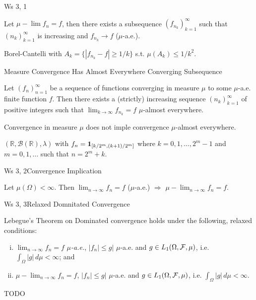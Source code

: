\begin{exercise}{Ws 3, 1}{}

    Let $\mu-\lim f_n = f$, then there exists a subsequence $(f_{n_k})_{k=1}^{\infty}$ such that $(n_k)_{k=1}^{\infty}$ is increasing and $f_{n_k} \to f$ ($\mu$-a.e.).

    \Hint Borel-Cantelli with $A_k = \{ |f_{n_k} - f| \geq 1/k \}$ s.t. $\mu(A_k) \leq 1/k^2$.

\end{exercise}

\begin{theorem}{5.4}{Measure Convergence Has Almost Everywhere Converging Subsequence}

    Let $(f_n)_{n=1}^{\infty}$ be a sequence of functions converging in measure $\mu$ to some $\mu$-a.e. finite function $f$. Then there exists a (strictly) increasing sequence $(n_k)_{k=1}^{\infty}$ of positive integers such that $\lim_{k \to \infty} f_{n_k} = f$ $\mu$-almost everywhere.

\end{theorem}

\begin{exercise}{5.5}{}

    Convergence in measure $\mu$ does not imple convergence $\mu$-almost everywhere.

    \Hint $(\mathbb{R}, \mathcal{B}(\mathbb{R}), \lambda)$ with $f_n = \mathbf{1}_{[k/2^m, (k+1)/2^m]}$ where $k = 0,1,\hdots,2^m - 1$ and $m=0,1,\hdots$ such that $n = 2^m + k$.

\end{exercise}

\begin{exercise}{Ws 3, 2}{Convergence Implication}

    Let $\mu(\Omega) < \infty$. Then $\lim_{n \to \infty} f_n = f$ ($\mu$-a.e.) $\Rightarrow$ $\mu-\lim_{n \to \infty} f_n = f$.

\end{exercise}

\begin{exercise}{Ws 3, 3}{Relaxed Domnitated Convergence}

    Lebegue's Theorem on Dominated convergence holds under the following, relaxed conditions:

        \begin{enumerate}[(i)]
            \item $\lim_{n \to \infty} f_n = f$ \emph{$\mu$-a.e.},  $|f_n| \leq g|$ $\mu$-a.e. and $g \in L_1(\Omega, \mathcal{F}, \mu)$, i.e. $\int_{\Omega} |g| \, d\mu < \infty$; and
            \item $\mu-\lim_{n \to \infty} f_n = f$,  $|f_n| \leq g|$ $\mu$-a.e. and $g \in L_1(\Omega, \mathcal{F}, \mu)$, i.e. $\int_{\Omega} |g| \, d\mu < \infty$.
        \end{enumerate}

    \Hint TODO

\end{exercise}
